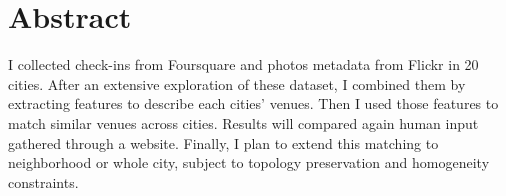 \begingroup
\let\clearpage\relax
\let\cleardoublepage\relax
\let\cleardoublepage\relax

\chapter*{Abstract}
I collected check-ins from Foursquare and photos metadata from Flickr in 20
cities. After an extensive exploration of these dataset, I combined them by
extracting features to describe each cities' venues. Then I used those
features to match similar venues across cities. Results will compared again
human input gathered through a website. Finally, I plan to extend this
matching to neighborhood or whole city, subject to topology preservation and
homogeneity constraints.

\endgroup			

\vfill
